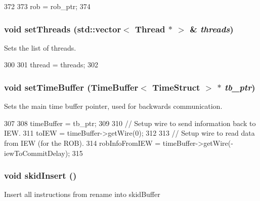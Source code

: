 \begin{DoxyCode}
372 {
373     rob = rob_ptr;
374 }
\end{DoxyCode}
\hypertarget{classDefaultCommit_aa8150d8ab62e6314eb07420a63aedce2}{
\subsubsection[{setThreads}]{\setlength{\rightskip}{0pt plus 5cm}void setThreads ({\bf std::vector}$<$ {\bf Thread} $\ast$ $>$ \& {\em threads})}}
\label{classDefaultCommit_aa8150d8ab62e6314eb07420a63aedce2}
Sets the list of threads. 


\begin{DoxyCode}
300 {
301     thread = threads;
302 }
\end{DoxyCode}
\hypertarget{classDefaultCommit_a2b521ea5f191fff72265f60d4ed5187b}{
\subsubsection[{setTimeBuffer}]{\setlength{\rightskip}{0pt plus 5cm}void setTimeBuffer ({\bf TimeBuffer}$<$ {\bf TimeStruct} $>$ $\ast$ {\em tb\_\-ptr})}}
\label{classDefaultCommit_a2b521ea5f191fff72265f60d4ed5187b}
Sets the main time buffer pointer, used for backwards communication. 


\begin{DoxyCode}
307 {
308     timeBuffer = tb_ptr;
309 
310     // Setup wire to send information back to IEW.
311     toIEW = timeBuffer->getWire(0);
312 
313     // Setup wire to read data from IEW (for the ROB).
314     robInfoFromIEW = timeBuffer->getWire(-iewToCommitDelay);
315 }
\end{DoxyCode}
\hypertarget{classDefaultCommit_affce029fbba116bb863eb2a3a7a5bb48}{
\subsubsection[{skidInsert}]{\setlength{\rightskip}{0pt plus 5cm}void skidInsert ()}}
\label{classDefaultCommit_affce029fbba116bb863eb2a3a7a5bb48}
Insert all instructions from rename into skidBuffer 


